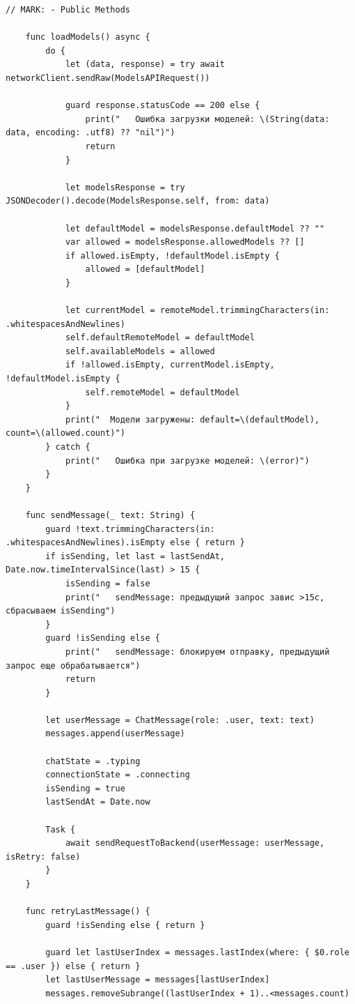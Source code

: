 \begin{lstlisting}[basicstyle=\tiny\ttfamily,breaklines=true]
    // MARK: - Public Methods

    func loadModels() async {
        do {
            let (data, response) = try await networkClient.sendRaw(ModelsAPIRequest())

            guard response.statusCode == 200 else {
                print("   Ошибка загрузки моделей: \(String(data: data, encoding: .utf8) ?? "nil")")
                return
            }

            let modelsResponse = try JSONDecoder().decode(ModelsResponse.self, from: data)

            let defaultModel = modelsResponse.defaultModel ?? ""
            var allowed = modelsResponse.allowedModels ?? []
            if allowed.isEmpty, !defaultModel.isEmpty {
                allowed = [defaultModel]
            }

            let currentModel = remoteModel.trimmingCharacters(in: .whitespacesAndNewlines)
            self.defaultRemoteModel = defaultModel
            self.availableModels = allowed
            if !allowed.isEmpty, currentModel.isEmpty, !defaultModel.isEmpty {
                self.remoteModel = defaultModel
            }
            print("  Модели загружены: default=\(defaultModel), count=\(allowed.count)")
        } catch {
            print("   Ошибка при загрузке моделей: \(error)")
        }
    }

    func sendMessage(_ text: String) {
        guard !text.trimmingCharacters(in: .whitespacesAndNewlines).isEmpty else { return }
        if isSending, let last = lastSendAt, Date.now.timeIntervalSince(last) > 15 {
            isSending = false
            print("   sendMessage: предыдущий запрос завис >15с, сбрасываем isSending")
        }
        guard !isSending else {
            print("   sendMessage: блокируем отправку, предыдущий запрос еще обрабатывается")
            return
        }

        let userMessage = ChatMessage(role: .user, text: text)
        messages.append(userMessage)

        chatState = .typing
        connectionState = .connecting
        isSending = true
        lastSendAt = Date.now

        Task {
            await sendRequestToBackend(userMessage: userMessage, isRetry: false)
        }
    }

    func retryLastMessage() {
        guard !isSending else { return }

        guard let lastUserIndex = messages.lastIndex(where: { $0.role == .user }) else { return }
        let lastUserMessage = messages[lastUserIndex]
        messages.removeSubrange((lastUserIndex + 1)..<messages.count)


\end{lstlisting}
